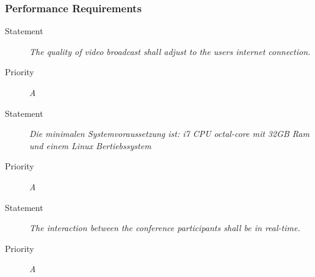 \subsubsection{Performance Requirements}

\NFR
\begin{description}
\item[Statement] \textit{The quality of video broadcast shall adjust to the
    users internet connection.}
\item[Priority] \textit{A}
\end{description}

\NFR
\begin{description}
\item[Statement] \textit{Die minimalen Systemvoraussetzung ist: i7 CPU octal-core mit 32GB Ram und einem Linux Bertiebssystem}
\item[Priority] \textit{A}
\end{description}

\NFR
\begin{description}
\item[Statement] \textit{The interaction between the conference participants
    shall be in real-time.}
\item[Priority] \textit{A}
\end{description}